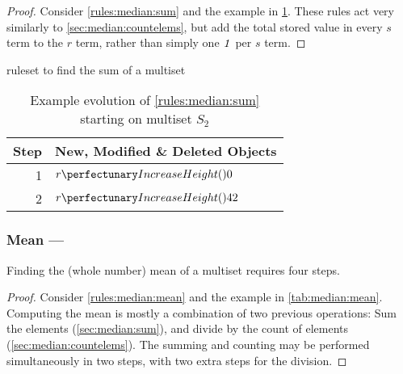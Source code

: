 \begin{proof}
Consider \cref{rules:median:sum} and the example in \cref{tab:median:sum}.  These rules act very similarly to \cref{sec:median:countelems}, but add the total stored value in every \(s\) term to the \(r\) term, rather than simply one \(\mathit{1}\) per \(s\) term.
\end{proof}

\begin{cprulesetfloat} \begin{cpruleset}
\end{cpruleset}
\caption{\label{rules:median:sum}\Gls{ruleset} to find the sum of a multiset}
\end{cprulesetfloat}

\begin{table}[htbp]
\centering
   \begin{tabular}{|r|l|}
    \hline
    \textbf{Step} & \textbf{New, Modified \& Deleted Objects} \\ \hline
    1 & \(\cpfunc{r}{0}\)\\ \hline
    2 & \(\cpfunc{r}{42}\)\\ \hline

\end{tabular}
\caption[Example evolution of \cref{rules:median:sum} to find the sum of a multiset]{\label{tab:median:sum}Example evolution of \cref{rules:median:sum} starting on multiset \(S_2\)}
\end{table}

\subsubsection{Mean --- }\label{sec:median:mean}

\begin{proposition}\label{prop:median:mean}
Finding the (whole number) mean of a multiset requires four steps.
\end{proposition}

\begin{proof}
Consider \cref{rules:median:mean} and the example in \cref{tab:median:mean}.  Computing the mean is mostly a combination of two previous operations:  Sum the elements (\cref{sec:median:sum}), and divide by the count of elements (\cref{sec:median:countelems}).  The summing and counting may be performed simultaneously in two steps, with two extra steps for the division.
\end{proof}

